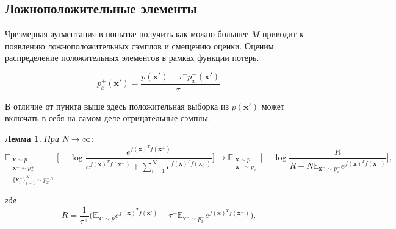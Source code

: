 \documentclass[a4paper, 12pt]{article}
\begin{document}
\subsection{Ложноположительные элементы}

Чрезмерная аугментация в попытке получить как можно большее $M$ приводит к появлению ложноположительных сэмплов и смещению оценки. Оценим распределение положительных элементов в рамках функции потерь.

\begin{equation}\label{eq:7}
p_x^+ (\textbf{x}') = \frac{p(\textbf{x}') - \tau^- p^-_x(\textbf{x}')}{\tau^+}
\end{equation}

В отличие от пункта выше здесь положительная выборка из $p(\mathbf{x'})$ может включать в себя на самом деле отрицательные сэмплы.

\newtheorem{theorem}{Теорема}
\newtheorem{lemma}[theorem]{Лемма}

\begin{lemma}
При $N \to \infty$:
\begin{equation} \label{eq:8}
\mathbb{E}_{\substack{\textbf{x} \sim p \\ \textbf{x}^+ \sim p_x^+ \\ \{\textbf{x}_i^-\}_{i=1}^N \sim {p_x^-}^N}} \bigg[ - \log \frac{e^{f(\textbf{x})^T f(\textbf{x}^+)}}{e^{f(\textbf{x})^T f(\textbf{x}^+)} + \sum_{i=1}^N e^{f(\textbf{x})^T f(\textbf{x}_i^-)}} \bigg] \longrightarrow
\mathbb{E}_{\substack{\textbf{x} \sim p \\ \textbf{x}^- \sim p_x^-}} \bigg[ - \log \frac{R}{R + N \mathbb{E}_{\textbf{x}^- \sim p_x^-} e^{f(\textbf{x})^T f(\textbf{x}^-)}} \bigg],
\end{equation}

\noindent где
\begin{equation}  \label{eq:9}
R = \frac{1}{\tau^+} \big(\mathbb{E}_{\textbf{x}' \sim p} e^{f(\textbf{x})^T f(\textbf{x}')} - \tau^- \mathbb{E}_{\textbf{x}^- \sim p_x^-} e^{f(\textbf{x})^T f(\textbf{x}^-)}\big).
\end{equation}
\end{lemma}
\end{document}
